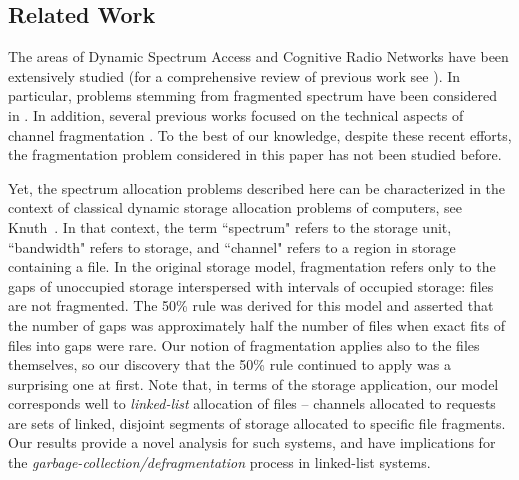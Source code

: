 \documentclass{amsart}
\begin{document}
\iffalse
\footnote{Ignoring simple scaling differences,
Knuth's model can be put in our context by disallowing
fragmentation:  a frequency band (channel) allocated to a packet
must be contained entirely within a single gap having a size at
least that of the packet. His 50\% rule in the model without
fragmentation says that, assuming that the probability of exact fits
is negligible; that channel sizes are small relative to the size of
the spectrum; and that the system is operating near steady state,
then the number of gaps is typically around $1/2$ the number of
packets.}
\fi

\iffalse
Since, the Markovian description is quite intricate, the convergence in distribution of
the state of the system at time $t$ when $t$ goes to infinity is proved only for some
distributions of sizes.
\fi









\subsection*{Related Work}\label{sec:related}

The areas of Dynamic Spectrum Access and Cognitive Radio Networks have been extensively studied (for a comprehensive review of previous work see
\cite{AkyildizLVM2006,AkyildizLC2009,KrenikWD2007,MahonenZ2007}). In particular, problems stemming from fragmented  spectrum  have been considered in \cite{JiaZS2008,YuanBahl2007,QinetiQ2006}. In addition, several previous works focused on the technical aspects of channel fragmentation \cite{GeirhoferTS2008,GhasemiS2008,Horne2005,HouYZSZ2009,JondralW2004,MahmoudYA2009,Rajbanshi2007}. To the best of our knowledge, despite these recent efforts, the fragmentation problem considered in this paper has not been studied before.



Yet, the  spectrum allocation  problems described here  can  be
characterized in  the context of classical dynamic  storage allocation
problems of computers,  see Knuth~\cite{Knuth1997}. In that context,
the term ``spectrum" refers to the  storage unit, ``bandwidth"
refers to storage, and ``channel" refers  to a region in storage
containing a file.  In the original storage model, fragmentation
refers only to the gaps of unoccupied storage interspersed with
intervals of occupied storage: files are not fragmented.  The 50\%
rule was derived for this model and asserted that the number of gaps
was approximately half the number of files when exact fits of files
into gaps were rare.  Our notion of fragmentation applies also to
the files themselves, so our discovery that the 50\% rule continued
to apply was a surprising one at first. Note that, in terms of the
storage application, our model corresponds well to {\it linked-list}
allocation of files -- channels allocated to requests are sets of linked, disjoint
segments of storage allocated to specific file fragments. Our results provide
a novel analysis for such systems, and have
implications for the {\em garbage-collection/defragmentation}
process in linked-list systems.
\end{document}

